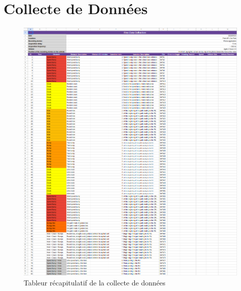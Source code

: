 \section{Collecte de Données}
\label{data_collection}

\begin{figure}
    \center
    \includegraphics[scale=0.5]{img/data_collection_1.png}
    \caption{Tableur récapitulatif de la collecte de données}
    \label{data_collection_1}
\end{figure}